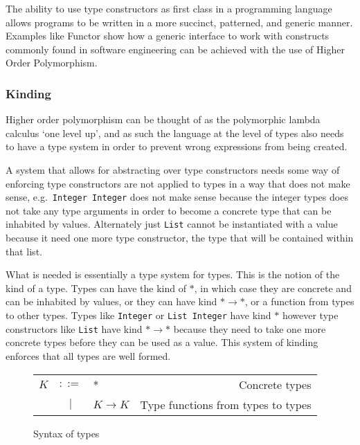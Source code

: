 The ability to use type constructors as first class in a programming language
allows programs to be written in a more succinct, patterned, and generic manner.
Examples like Functor show how a generic interface to work with constructs
commonly found in software engineering can be achieved with the use of Higher
Order Polymorphism. 

\subsubsection{Kinding}

Higher order polymorphism can be thought of as the polymorphic lambda calculus
`one level up', and as such the language at the level of types also needs to 
have a type system in order to prevent wrong expressions from being created.

A system that allows for abstracting over type constructors needs some way
of enforcing type constructors are not applied to types in a way that does not
make sense, e.g.\ \lstinline{Integer Integer} does not make sense because the
integer types does not take any type arguments in order to become a concrete
type that can be inhabited by values. Alternately just \lstinline{List} cannot
be instantiated with a value because it need one more type constructor, 
the type that will be contained within that list.

What is needed is essentially a type system for types. This is the notion of
the kind of a type. Types can have the kind of $ * $, in which case
they are concrete and can be inhabited by values, or they can have kind
$ * \rightarrow * $, or a function from types to other types. Types like
\lstinline{Integer} or \lstinline{List Integer} have kind $ * $ however
type constructors like \lstinline{List} have kind 
$ * \rightarrow * $ because they need to take one more concrete
types before they can be used as a value. This system of kinding enforces that
all types are well formed.

\begin{figure}[H]\label{fig:kinds}
    \centering
    \begin{tabular}{l c p{3cm} r}
        $ K $ & $ ::= $ & * &                   Concrete types \\
      & $ | $ & $ K \rightarrow K $ &           Type functions from types to types \\
    \end{tabular}
    \caption{Syntax of types}
\end{figure}

